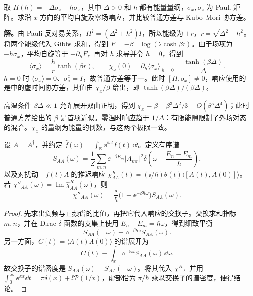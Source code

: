 \begin{workedexample}[非对易二能级系统的静态响应]
取 $H(h)=-\Delta\sigma_z-h\sigma_x$，其中 $\Delta>0$ 和 $h$ 都有能量量纲，$\sigma_x,\sigma_z$ 为 Pauli 矩阵。求沿 $x$ 方向的平均自旋及零场响应，并比较普通方差与 Kubo--Mori 协方差。

\textbf{解。}由 Pauli 反对易关系，$H^2=(\Delta^2+h^2)I$，所以能级为 $\pm r$，$r=\sqrt{\Delta^2+h^2}$。将两个能级代入 Gibbs 求和，得到 $F=-\beta^{-1}\log(2\cosh\beta r)$。由于场项为 $-h\sigma_x$，平均自旋等于 $-\partial_hF$，再对 $h$ 求导并令 $h=0$，得到
\[
 \langle\sigma_x\rangle=\frac{h}{r}\tanh(\beta r),\qquad
 \chi_x(0)=\left.\partial_h\langle\sigma_x\rangle\right|_{h=0}=\frac{\tanh(\beta\Delta)}{\Delta}.
\]
$h=0$ 时 $\langle\sigma_x\rangle=0$、$\sigma_x^2=I$，故普通方差等于一。此时 $[H,\sigma_x]\ne0$，响应使用的是中的虚时间协方差，其值由 $\chi_x/\beta$ 给出，即 $\tanh(\beta\Delta)/(\beta\Delta)$。

高温条件 $\beta\Delta\ll1$ 允许展开双曲正切，得到 $\chi_x=\beta-\beta^3\Delta^2/3+O(\beta^5\Delta^4)$；此时普通方差给出的 $\beta$ 是首项近似。零温时响应趋于 $1/\Delta$：有限能隙限制了外场对态的混合。$\chi_x$ 的量纲为能量的倒数，与这两个极限一致。
\end{workedexample}

\begin{proposition}
设 \(A=A^\dagger\)，并约定 \(\widehat f(\omega)=\int_{\mathbb R}\ee^{\ii\omega t}f(t)\,\dd t\)。定义有序谱
\[
S_{AA}(\omega)=\frac1Z\sum_{m,n}\ee^{-\beta E_m}|A_{mn}|^2
\delta\!\left(\omega-\frac{E_n-E_m}{\hbar}\right),
\]
以及对扰动 \(-f(t)A\) 的推迟响应
\(\chi^R_{AA}(t)=(\ii/\hbar)\theta(t)\langle[A(t),A(0)]\rangle\)。若 \(\chi''_{AA}(\omega)=\operatorname{Im}\widehat\chi^R_{AA}(\omega)\)，则
\begin{equation}
\chi''_{AA}(\omega)
=\frac{\pi}{\hbar}\bigl(1-\ee^{-\beta\hbar\omega}\bigr)S_{AA}(\omega).
\label{eq:phys-sm-fluctuation-dissipation}
\end{equation}
\end{proposition}

\begin{proof}
先求出负频与正频谱的比值，再把它代入响应的交换子。交换求和指标 \(m,n\)，并在 Dirac $\delta$ 函数的支集上使用 \(E_n-E_m=\hbar\omega\)，得到细致平衡
\[
S_{AA}(-\omega)=\ee^{-\beta\hbar\omega}S_{AA}(\omega).
\]
另一方面，\(C(t)=\langle A(t)A(0)\rangle\) 的谱展开为
\[
C(t)=\int_{\mathbb R}\ee^{-\ii\omega t}S_{AA}(\omega)\,\dd\omega.
\]
故交换子的谱密度是 \(S_{AA}(\omega)-S_{AA}(-\omega)\)。将其代入 \(\chi^R\)，并用
\(\int_0^\infty \ee^{\ii xt}\dd t=\pi\delta(x)+\ii\mathcal P(1/x)\)，虚部恰为 \(\pi/\hbar\) 乘以交换子的谱密度，便得结论。
\end{proof}


